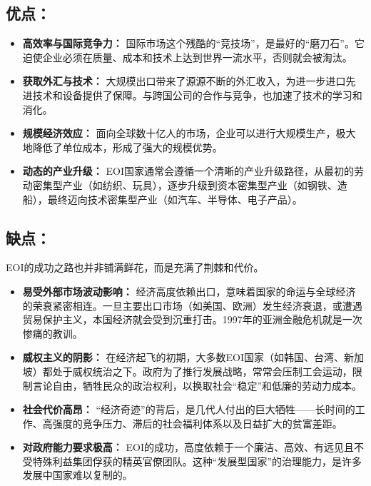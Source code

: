 \subsection{优点：}

\begin{itemize}
    \item \textbf{高效率与国际竞争力：} 国际市场这个残酷的“竞技场”，是最好的“磨刀石”。它迫使企业必须在质量、成本和技术上达到世界一流水平，否则就会被淘汰。
    \item \textbf{获取外汇与技术：} 大规模出口带来了源源不断的外汇收入，为进一步进口先进技术和设备提供了保障。与跨国公司的合作与竞争，也加速了技术的学习和消化。
    \item \textbf{规模经济效应：} 面向全球数十亿人的市场，企业可以进行大规模生产，极大地降低了单位成本，形成了强大的规模优势。
    \item \textbf{动态的产业升级：} EOI国家通常会遵循一个清晰的产业升级路径，从最初的劳动密集型产业（如纺织、玩具），逐步升级到资本密集型产业（如钢铁、造船），最终迈向技术密集型产业（如汽车、半导体、电子产品）。
\end{itemize}

\subsection{缺点：}

EOI的成功之路也并非铺满鲜花，而是充满了荆棘和代价。

\begin{itemize}
    \item \textbf{易受外部市场波动影响：} 经济高度依赖出口，意味着国家的命运与全球经济的荣衰紧密相连。一旦主要出口市场（如美国、欧洲）发生经济衰退，或遭遇贸易保护主义，本国经济就会受到沉重打击。1997年的亚洲金融危机就是一次惨痛的教训。
    \item \textbf{威权主义的阴影：} 在经济起飞的初期，大多数EOI国家（如韩国、台湾、新加坡）都处于威权统治之下。政府为了推行发展战略，常常会压制工会运动，限制言论自由，牺牲民众的政治权利，以换取社会“稳定”和低廉的劳动力成本。
    \item \textbf{社会代价高昂：} “经济奇迹”的背后，是几代人付出的巨大牺牲——长时间的工作、高强度的竞争压力、滞后的社会福利体系以及日益扩大的贫富差距。
    \item \textbf{对政府能力要求极高：} EOI的成功，高度依赖于一个廉洁、高效、有远见且不受特殊利益集团俘获的精英官僚团队。这种“发展型国家”的治理能力，是许多发展中国家难以复制的。
\end{itemize}

